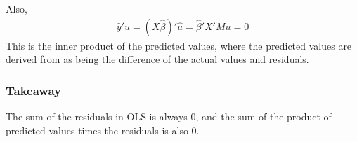 \documentclass[letterpaper,10pt,english]{jupyterBook}
\begin{document}
Also,
\begin{equation*}
\begin{split}\hat y' \hat u = (X \hat\beta)'\hat u = \hat\beta'X'Mu = 0\end{split}
\end{equation*}
This is the inner product of the predicted values, where the predicted
values are derived from as being the difference of the actual values and
residuals.


\subsubsection{Takeaway}
\label{\detokenize{parts/econometric-theory/linearmodels:takeaway}}
The sum of the residuals in OLS is always 0, and the sum of the product
of predicted values times the residuals is also 0.
\end{document}
